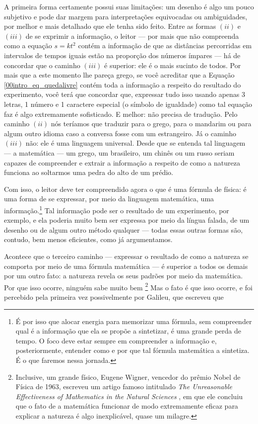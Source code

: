 A primeira forma certamente possui suas limitações: um desenho é algo um pouco subjetivo e pode dar margem para interpretações equivocadas ou ambiguidades, por melhor e mais detalhado que ele tenha sido feito. Entre as formas $(ii)$ e $(iii)$ de se exprimir a informação, o leitor --- por mais que não compreenda como a equação $s=kt^2$ contém a informação de que as distâncias percorridas em intervalos de tempos iguais estão na proporção dos números ímpares --- há de concordar que o caminho $(iii)$ é superior: ele é o mais sucinto de todos. Por mais que a este momento lhe pareça grego, se você acreditar que a Equação \eqref{00intro_eq_quedalivre} contém toda a informação a respeito do resultado do experimento, você terá que concordar que, expressar tudo isso usando apenas 3 letras, 1 número e 1 caractere especial (o símbolo de igualdade) como tal equação faz é algo extremamente sofisticado. E melhor: não precisa de tradução. Pelo caminho $(ii)$ nós teríamos que traduzir para o grego, para o mandarim ou para algum outro idioma caso a conversa fosse com um estrangeiro. Já o caminho $(iii)$ não: ele é uma linguagem universal. Desde que se entenda tal linguagem --- a matemática --- um grego, um brasileiro, um chinês ou um russo seriam capazes de compreender e extrair a informação a respeito de como a natureza funciona ao soltarmos uma pedra do alto de um prédio.

Com isso, o leitor deve ter compreendido agora o que é uma fórmula de física: é uma forma de se expressar, por meio da linguagem matemática, uma informação.\footnote{É por isso que alocar energia para memorizar uma fórmula, sem compreender qual é a informação que ela se propõe a sintetizar, é uma grande perda de tempo. O foco deve estar sempre em compreender a informação e, posteriormente, entender como e por que tal fórmula matemática a sintetiza. É o que faremos nessa jornada.} Tal informação pode ser o resultado de um experimento, por exemplo, e ela poderia muito bem ser expressa por meio da língua falada, de um desenho ou de algum outro método qualquer --- todas essas outras formas são, contudo, bem menos eficientes, como já argumentamos.

Acontece que o terceiro caminho --- expressar o resultado de como a natureza se comporta por meio de uma fórmula matemática --- é superior a todos os demais por um outro fato: a natureza revela os seus padrões por meio da matemática. Por que isso ocorre, ninguém sabe muito bem \footnote{Inclusive, um grande físico, Eugene Wigner, vencedor do prêmio Nobel de Física de 1963, escreveu um artigo famoso intitulado \textit{The Unreasonable Effectiveness of Mathematics in the Natural Sciences} , em que ele concluiu que o fato de a matemática funcionar de modo extremamente eficaz para explicar a natureza é algo inexplicável, quase um milagre.} Mas o fato é que isso ocorre, e foi percebido pela primeira vez possivelmente por Galileu, que escreveu que

